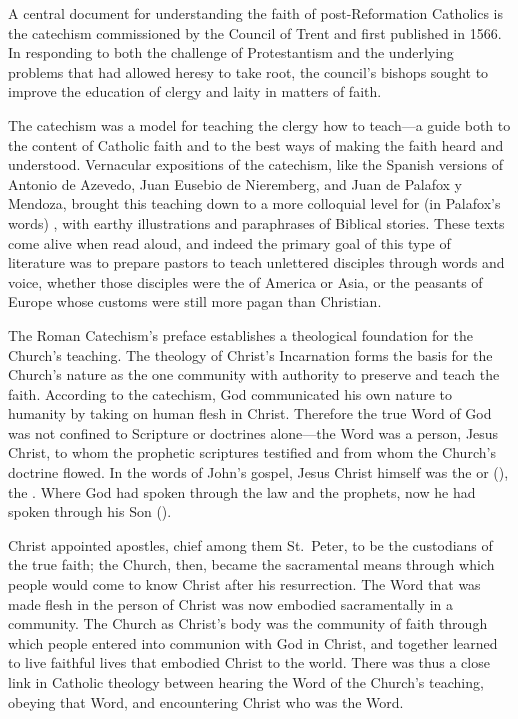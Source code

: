 A central document for understanding the faith of post-Reformation Catholics is the catechism  commissioned by the Council of Trent and first published in 1566.%
\Autocites{Catholic:Catechismus1614}[]{NewCatholic}
In responding to both the challenge of Protestantism and the underlying problems that had allowed heresy to take root, the council's bishops sought to improve the education of clergy and laity in matters of faith.

The catechism was a model for teaching the clergy how to teach---a guide both to the content of Catholic faith and to the best ways of making the faith heard and understood.
Vernacular expositions of the catechism, like the Spanish versions of Antonio de Azevedo, Juan Eusebio de Nieremberg, and Juan de Palafox y Mendoza, brought this teaching down to a more colloquial level for (in Palafox's words) , with earthy illustrations and paraphrases of Biblical stories.%
\autocites{Azevedo:Catecismo}{Nieremberg:PracticaCatecismo}{Palafox:Bocados}
These texts come alive when read aloud, and indeed the primary goal of this type of literature was to prepare pastors to teach unlettered disciples through words and voice, whether those disciples were the  of America or Asia, or the peasants of Europe whose customs were still more pagan than Christian.

The Roman Catechism's preface establishes a theological foundation for the Church's teaching.
The theology of Christ's Incarnation forms the basis for the Church's nature as the one community with authority to preserve and teach the faith.
According to the catechism, God communicated his own nature to humanity by taking on human flesh in Christ.
Therefore the true Word of God was not confined to Scripture or doctrines alone---the Word was a person, Jesus Christ, to whom the prophetic scriptures testified and from whom the Church's doctrine flowed.
In the words of John's gospel, Jesus Christ himself was the  or  (), the .
Where God had spoken through the law and the prophets, now he had spoken through his Son ().

Christ appointed apostles, chief among them St.\ Peter, to be the custodians of the true faith; the Church, then, became the sacramental means through which people would come to know Christ after his resurrection.
The Word that was made flesh in the person of Christ was now embodied sacramentally in a community.
The Church as Christ's body was the community of faith through which people entered into communion with God in Christ, and together learned to live faithful lives that embodied Christ to the world.
There was thus a close link in Catholic theology between hearing the Word of the Church's teaching, obeying that Word, and encountering Christ who was the Word.


